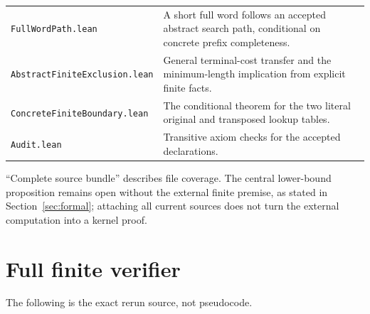 \documentclass[11pt]{article}
\begin{document}
{\begin{longtable}{@{}p{.40\linewidth}p{.56\linewidth}@{}}
\texttt{FullWordPath.lean}&A short full word follows an accepted abstract
search path, conditional on concrete prefix completeness.\\
\texttt{AbstractFiniteExclusion.lean}&General terminal-cost transfer and
the minimum-length implication from explicit finite facts.\\
\texttt{ConcreteFiniteBoundary.lean}&The conditional theorem for the two
literal original and transposed lookup tables.\\
\texttt{Audit.lean}&Transitive axiom checks for the accepted declarations.\\\bottomrule
\end{longtable}}
``Complete source bundle'' describes file coverage. The central lower-bound
proposition remains open without the external finite premise, as stated in
Section~\ref{sec:formal}; attaching all current sources does not turn the
external computation into a kernel proof.

\section{Full finite verifier}
The following is the exact rerun source, not pseudocode.

\end{document}
